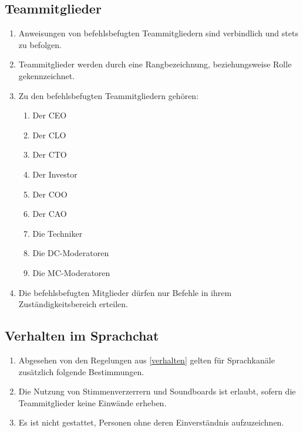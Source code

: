\documentclass{article}
\begin{document}
\subsection{Teammitglieder}\label{members}
\begin{enumerate}[(1)]
	\item Anweisungen von befehlsbefugten Teammitgliedern sind verbindlich und stets zu befolgen.
	\item Teammitglieder werden durch eine Rangbezeichnung, beziehungsweise Rolle gekennzeichnet.
	\item Zu den befehlsbefugten Teammitgliedern gehören:
	\begin{enumerate}
		\item Der CEO
		\item Der CLO
		\item Der CTO
		\item Der Investor
		\item Der COO
		\item Der CAO
		\item Die Techniker
		\item Die DC-Moderatoren
		\item Die MC-Moderatoren
	\end{enumerate}
	\item Die befehlsbefugten Mitglieder dürfen nur Befehle in ihrem Zuständigkeitsbereich erteilen.
\end{enumerate}

\subsection{Verhalten im Sprachchat}
\begin{enumerate}[(1)]
	\item Abgesehen von den Regelungen aus \ref{verhalten} gelten für Sprachkanäle zusätzlich folgende Bestimmungen.
	\item Die Nutzung von Stimmenverzerrern und Soundboards ist erlaubt, sofern die Teammitglieder keine Einwände erheben.
	\item Es ist nicht gestattet, Personen ohne deren Einverständnis aufzuzeichnen.
\end{enumerate}
\end{document}
